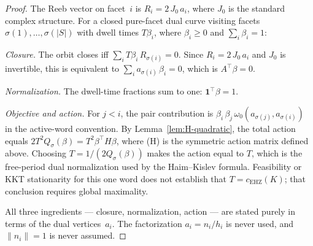 \begin{proof}
The Reeb vector on facet~$i$ is
$R_i = 2\, J_0\, a_i$, where $J_0$ is the standard
complex structure.
For a closed pure-facet dual curve visiting facets
$\sigma(1), \ldots, \sigma(|S|)$ with dwell times
$T\beta_i$, where $\beta_i\geq0$ and $\sum_i\beta_i=1$:

\emph{Closure.}
The orbit closes iff
$\sum_i T\beta_i\, R_{\sigma(i)} = 0$.
Since $R_i = 2\, J_0\, a_i$ and $J_0$ is invertible, this is equivalent to
$\sum_i a_{\sigma(i)}\, \beta_i = 0$,
which is $A^\top \beta = 0$.

\emph{Normalization.}
The dwell-time fractions sum to one:
$\mathbf{1}^\top \beta = 1$.

\emph{Objective and action.}
For \(j<i\), the pair contribution is
$\beta_i\,\beta_j\,\omega_0(a_{\sigma(j)}, a_{\sigma(i)})$
in the active-word convention.
By Lemma~\ref{lem:H-quadratic}, the total action equals
$2T^2Q_\sigma(\beta)=T^2\beta^\top H\beta$,
where (H) is the symmetric action matrix defined above.
Choosing \(T=1/(2Q_\sigma(\beta))\) makes the action equal to \(T\),
which is the free-period dual normalization used by the Haim--Kislev
formula.  Feasibility or KKT stationarity for this one word does not establish
that \(T=c_{\mathrm{EHZ}}(K)\); that conclusion requires global maximality.

All three ingredients --- closure, normalization, action ---
are stated purely in terms of the dual vertices~$a_i$.
The factorization $a_i = n_i/h_i$ is never used, and
$\|n_i\| = 1$ is never assumed.
\end{proof}



